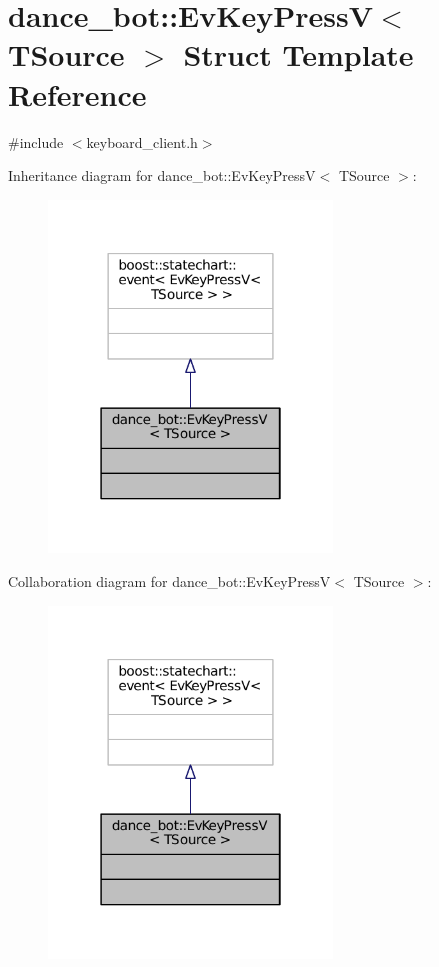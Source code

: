 \hypertarget{structdance__bot_1_1EvKeyPressV}{}\section{dance\+\_\+bot\+:\+:Ev\+Key\+PressV$<$ T\+Source $>$ Struct Template Reference}
\label{structdance__bot_1_1EvKeyPressV}


{\ttfamily \#include $<$keyboard\+\_\+client.\+h$>$}



Inheritance diagram for dance\+\_\+bot\+:\+:Ev\+Key\+PressV$<$ T\+Source $>$\+:
\nopagebreak
\begin{figure}[H]
\begin{center}
\leavevmode
\includegraphics[width=214pt]{structdance__bot_1_1EvKeyPressV__inherit__graph}
\end{center}
\end{figure}


Collaboration diagram for dance\+\_\+bot\+:\+:Ev\+Key\+PressV$<$ T\+Source $>$\+:
\nopagebreak
\begin{figure}[H]
\begin{center}
\leavevmode
\includegraphics[width=214pt]{structdance__bot_1_1EvKeyPressV__coll__graph}
\end{center}
\end{figure}


